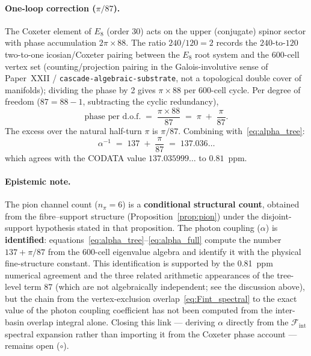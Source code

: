 \documentclass[12pt]{article}
\newcommand{\Fcal}{\mathcal{F}}
\newcommand{\Fint}{\Fcal_{\mathrm{int}}}
\begin{document}
\paragraph{One-loop correction ($\pi/87$).}
The Coxeter element of $E_8$ (order 30) acts on the upper (conjugate)
spinor sector with phase accumulation $2\pi \times 88$. The ratio
$240/120 = 2$ records the $240$-to-$120$ two-to-one icosian/Coxeter pairing between the $E_8$ root system and the 600-cell vertex set (counting/projection pairing in the Galois-involutive sense of Paper~XXII / \texttt{cascade-algebraic-substrate}, not a topological double cover of manifolds); dividing the phase by 2 gives
$\pi \times 88$ per 600-cell cycle. Per degree of freedom
($87 = 88 - 1$, subtracting the cyclic redundancy),
\begin{equation}\label{eq:alpha_oneloop}
    \text{phase per d.o.f.} \;=\; \frac{\pi \times 88}{87} \;=\; \pi \;+\; \frac{\pi}{87}.
\end{equation}
The excess over the natural half-turn $\pi$ is $\pi/87$. Combining
with~\eqref{eq:alpha_tree}:
\begin{equation}\label{eq:alpha_full}
    \alpha^{-1} \;=\; 137 \;+\; \frac{\pi}{87} \;=\; 137.036\ldots
\end{equation}
which agrees with the CODATA value $137.035999\ldots$ to $0.81$~ppm.

\paragraph{Epistemic note.}
The pion channel count ($n_\pi = 6$) is a \textbf{conditional structural count}, obtained from the fibre--support structure (Proposition~\ref{prop:pion}) under the disjoint-support hypothesis stated in that proposition. The
photon coupling ($\alpha$) is \textbf{identified}:
equations~\eqref{eq:alpha_tree}--\eqref{eq:alpha_full} compute the
number $137 + \pi/87$ from the 600-cell eigenvalue algebra and
identify it with the physical fine-structure constant. This
identification is supported by the 0.81~ppm numerical agreement and
the three related arithmetic appearances of the tree-level term $87$ (which are not algebraically independent; see the discussion above), but the chain
from the vertex-exclusion overlap~\eqref{eq:Fint_spectral} to the
exact value of the photon coupling coefficient has not been
computed from the inter-basin overlap integral alone. Closing this
link --- deriving $\alpha$ directly from the $\Fint$ spectral
expansion rather than importing it from the Coxeter phase account
--- remains open ($\circ$).
\end{document}
